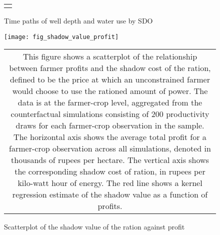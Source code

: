 \documentclass{article}
\numberwithin{table}{section}
\begin{document}
\begin{figure}[htbp]
	\centering
	\caption{Time paths of well depth and water use by SDO}
	\subfiguretopcaptrue
	\begin{tabular*}{1.0\textwidth}{c}
		\multicolumn{1}{p{1.0\hsize}}{\footnotesize }\\
	\end{tabular*}
\end{figure}

\begin{figure}
	\centering
	\caption{Scatterplot of the shadow value of the ration against profit}
	\texttt{[image: fig\_shadow\_value\_profit]}
		\begin{tabular*}{1.0\textwidth}{c}
		\multicolumn{1}{p{1.0\hsize}}{\footnotesize This figure shows a scatterplot of the relationship between farmer profits and the shadow cost of the ration, defined to be the price at which an unconstrained farmer would choose to use the rationed amount of power. The data is at the farmer-crop level, aggregated from the counterfactual simulations consisting of 200 productivity draws for each farmer-crop observation in the sample. The horizontal axis shows the average total profit for a farmer-crop observation across all simulations, denoted in thousands of rupees per hectare. The vertical axis shows the corresponding shadow cost of ration, in rupees per kilo-watt hour of energy. The red line shows a kernel regression estimate of the shadow value as a function of profits. }\\
	\end{tabular*}
\end{figure}
\end{document}
